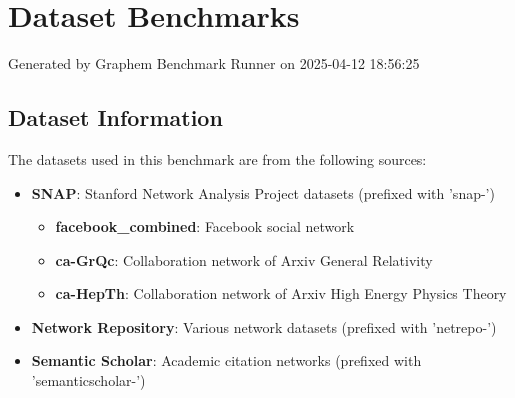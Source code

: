 \documentclass{article}
\begin{document}
\section*{Dataset Benchmarks}
Generated by Graphem Benchmark Runner on 2025-04-12 18:56:25
\subsection*{Dataset Information}
The datasets used in this benchmark are from the following sources:
\begin{itemize}
\item \textbf{SNAP}: Stanford Network Analysis Project datasets (prefixed with 'snap-')
  \begin{itemize}
  \item \textbf{facebook\_combined}: Facebook social network
  \item \textbf{ca-GrQc}: Collaboration network of Arxiv General Relativity
  \item \textbf{ca-HepTh}: Collaboration network of Arxiv High Energy Physics Theory
  \end{itemize}
\item \textbf{Network Repository}: Various network datasets (prefixed with 'netrepo-')
\item \textbf{Semantic Scholar}: Academic citation networks (prefixed with 'semanticscholar-')
\end{itemize}
\end{document}
